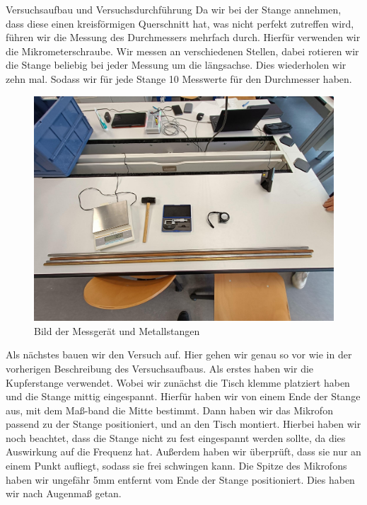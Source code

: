 \documentclass[twoside]{protokoll}
\begin{document}
\begin{aufgabe}{Versuchsaufbau und Versuchsdurchführung}
Da wir bei der Stange annehmen, dass diese einen kreisförmigen Querschnitt hat, was nicht perfekt zutreffen wird, führen wir die Messung des Durchmessers mehrfach durch. Hierfür verwenden wir die Mikrometerschraube. Wir messen an verschiedenen Stellen, dabei rotieren wir die Stange beliebig bei jeder Messung um die längsachse. Dies wiederholen wir zehn mal. Sodass wir für jede Stange 10 Messwerte für den Durchmesser haben.\\ 

\begin{figure}[H]
  \centering
  \includegraphics[width=1.0\textwidth]{Bilder/434170_428396_1A3_Materialien.pdf}
  \caption{Bild der Messgerät und Metallstangen}
  \centering
\end{figure}

Als nächstes bauen wir den Versuch auf. Hier gehen wir genau so vor wie in der vorherigen Beschreibung des Versuchsaufbaus. Als erstes haben wir die Kupferstange verwendet.
Wobei wir zunächst die Tisch klemme platziert haben und die Stange mittig eingespannt. Hierfür haben wir von einem Ende der Stange aus, mit dem Maß-band die Mitte bestimmt. Dann haben wir das Mikrofon passend zu der Stange positioniert, und an den Tisch montiert. Hierbei haben wir noch beachtet, dass die Stange nicht zu fest eingespannt werden sollte, da dies Auswirkung auf die Frequenz hat. Außerdem haben wir überprüft, dass sie nur an einem Punkt aufliegt, sodass sie frei schwingen kann. Die Spitze des Mikrofons haben wir ungefähr 5mm entfernt vom Ende der Stange positioniert. Dies haben wir nach Augenmaß getan. 


\end{aufgabe}
\end{document}
